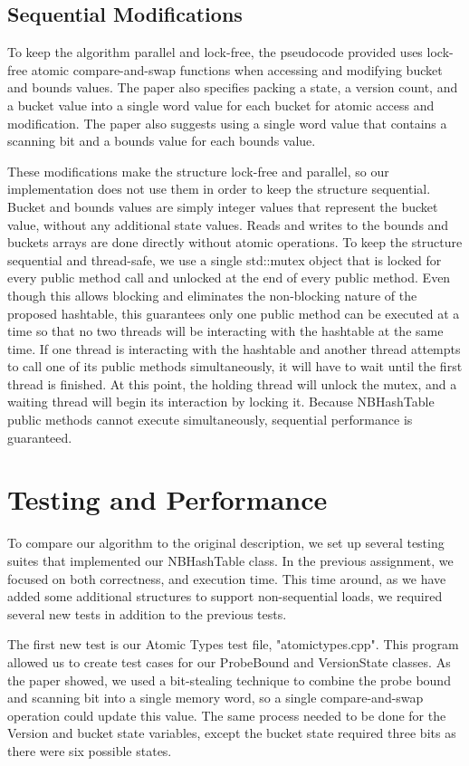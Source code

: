 \documentclass[journal]{IEEEtran}
\begin{document}
\subsection{Sequential Modifications}
To keep the algorithm parallel and lock-free, the pseudocode provided uses lock-free atomic compare-and-swap functions when accessing and modifying bucket and bounds values. The paper also specifies packing a state, a version count, and a bucket value into a single word value for each bucket for atomic access and modification. The paper also suggests using a single word value that contains a scanning bit and a bounds value for each bounds value.

These modifications make the structure lock-free and parallel, so our implementation does not use them in order to keep the structure sequential. Bucket and bounds values are simply integer values that represent the bucket value, without any additional state values. Reads and writes to the bounds and buckets arrays are done directly without atomic operations. To keep the structure sequential and thread-safe, we use a single std::mutex object that is locked for every public method call and unlocked at the end of every public method. Even though this allows blocking and eliminates the non-blocking nature of the proposed hashtable, this guarantees only one public method can be executed at a time so that no two threads will be interacting with the hashtable at the same time. If one thread is interacting with the hashtable and another thread attempts to call one of its public methods simultaneously, it will have to wait until the first thread is finished. At this point, the holding thread will unlock the mutex, and a waiting thread will begin its interaction by locking it. Because NBHashTable public methods cannot execute simultaneously, sequential performance is guaranteed.

\section{Testing and Performance}

To compare our algorithm to the original description, we set up several testing suites that implemented our NBHashTable class. In the previous assignment, we focused on both correctness, and execution time. This time around, as we have added some additional structures to support non-sequential loads, we required several new tests in addition to the previous tests.

The first new test is our Atomic Types test file, "atomictypes.cpp". This program allowed us to create test cases for our ProbeBound and VersionState classes. As the paper showed, we used a bit-stealing technique to combine the probe bound and scanning bit into a single memory word, so a single compare-and-swap operation could update this value. The same process needed to be done for the Version and bucket state variables, except the bucket state required three bits as there were six possible states.
\end{document}
